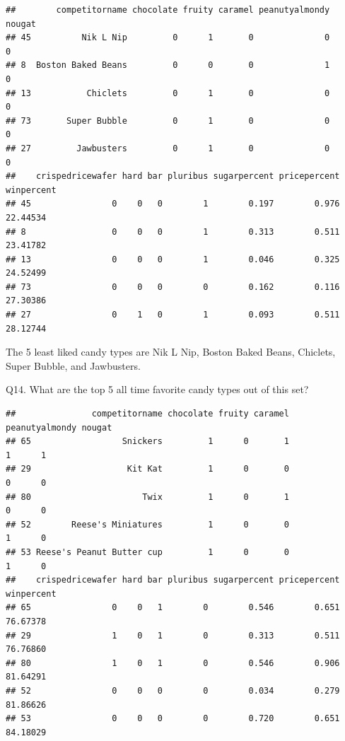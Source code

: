 \documentclass[
]{article}
\newenvironment{Shaded}{\begin{snugshade}}{\end{snugshade}}
\newcommand{\AttributeTok}[1]{\textcolor[rgb]{0.13,0.29,0.53}{#1}}
\newcommand{\DecValTok}[1]{\textcolor[rgb]{0.00,0.00,0.81}{#1}}
\newcommand{\FunctionTok}[1]{\textcolor[rgb]{0.13,0.29,0.53}{\textbf{#1}}}
\newcommand{\NormalTok}[1]{#1}
\newcommand{\SpecialCharTok}[1]{\textcolor[rgb]{0.81,0.36,0.00}{\textbf{#1}}}
\begin{document}
\begin{verbatim}
##        competitorname chocolate fruity caramel peanutyalmondy nougat
## 45          Nik L Nip         0      1       0              0      0
## 8  Boston Baked Beans         0      0       0              1      0
## 13           Chiclets         0      1       0              0      0
## 73       Super Bubble         0      1       0              0      0
## 27         Jawbusters         0      1       0              0      0
##    crispedricewafer hard bar pluribus sugarpercent pricepercent winpercent
## 45                0    0   0        1        0.197        0.976   22.44534
## 8                 0    0   0        1        0.313        0.511   23.41782
## 13                0    0   0        1        0.046        0.325   24.52499
## 73                0    0   0        0        0.162        0.116   27.30386
## 27                0    1   0        1        0.093        0.511   28.12744
\end{verbatim}

The 5 least liked candy types are Nik L Nip, Boston Baked Beans,
Chiclets, Super Bubble, and Jawbusters.

Q14. What are the top 5 all time favorite candy types out of this set?

\begin{Shaded}
\end{Shaded}

\begin{verbatim}
##               competitorname chocolate fruity caramel peanutyalmondy nougat
## 65                  Snickers         1      0       1              1      1
## 29                   Kit Kat         1      0       0              0      0
## 80                      Twix         1      0       1              0      0
## 52        Reese's Miniatures         1      0       0              1      0
## 53 Reese's Peanut Butter cup         1      0       0              1      0
##    crispedricewafer hard bar pluribus sugarpercent pricepercent winpercent
## 65                0    0   1        0        0.546        0.651   76.67378
## 29                1    0   1        0        0.313        0.511   76.76860
## 80                1    0   1        0        0.546        0.906   81.64291
## 52                0    0   0        0        0.034        0.279   81.86626
## 53                0    0   0        0        0.720        0.651   84.18029
\end{verbatim}
\end{document}
